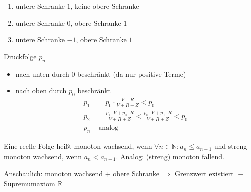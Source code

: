 \begin{example}
\begin{enumerate}
	\item untere Schranke $1$, keine obere Schranke
	\item untere Schranke $0$, obere Schranke $1$
	\item untere Schranke $-1$, obere Schranke $1$
\end{enumerate}
\end{example}

\begin{example}
Druckfolge $p_n$
\begin{itemize}
\item nach unten durch 0 beschränkt (da nur positive Terme)
\item nach oben durch $p_0$ beschränkt
\begin{align*}
p_1 &= p_0 \cdot \frac{V + R}{V + R + Z} < p_0 \\
p_2 &= \frac{p_1 \cdot V + p_0 \cdot R}{V + R + Z} < \frac{p_0 \cdot V + p_0 \cdot R}{V + R + Z} < p_0 \\
p_n &\text{ analog}
\end{align*}
\end{itemize}
\end{example}

\begin{definition}[Monotonie]
Eine reelle Folge heißt monoton wachsend, wenn $\forall n \in \mathbb N : a_n \le a_{n+1}$ und
streng monoton wachsend, wenn $a_n < a_{n+1}$. Analog: (streng) monoton fallend.
\end{definition}
Anschaulich: monoton wachsend + obere Schranke $\Rightarrow$ Grenzwert existiert $\equiv$ Supremumaxiom $\mathbb R$